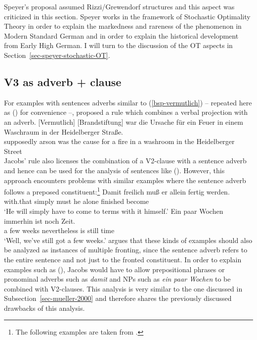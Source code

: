 Speyer's proposal assumed Rizzi/Grewendorf structures and this aspect was criticized in this
section. Speyer works in the framework of Stochastic Optimality Theory in order to explain the
markedness and rareness of the phenomenon in Modern Standard German and in order to explain the
historical development from Early High German. I will turn to the discussion of the OT aspects in Section~\ref{sec-speyer-stochastic-OT}.


\subsection{V3 as adverb + clause}

For examples with sentences adverbs similar to (\ref{bsp-vermutlich}) -- repeated here as ()
for convenience --, \citet[]{Jacobs86a} proposed a rule which combines
a verbal projection with an adverb. 
\ea
\label{bsp-vermutlich-zwei}
\gll {}[Vermutlich] [Brandstiftung] war die Ursache für ein Feuer in einem Waschraum in der Heidelberger Straße.\footnotemark\\
	   \spacebr{}supposedly \spacebr{}arson was the cause for a fire in a washroom in the Heidelberger Street\\
\z
Jacobs' rule also licenses the combination of a V2-clause with a sentence adverb and hence can be
used for the analysis of sentences like (). However, this approach encounters problems with
similar examples where the sentence adverb follows a preposed constituent:\footnote{ 
        The following examples are taken from \citet[]{Engel88}.%
}
\eal
\ex 
\gll Damit freilich muß er allein fertig werden.\\
     with.that simply must he alone finished become\\
\glt `He will simply have to come to terms with it himself.'
\ex 
\gll Ein paar Wochen immerhin ist noch Zeit.\\
     a few weeks nevertheless is still time\\
\glt `Well, we've still got a few weeks.'
\zl
\citet[]{Duerscheid89a} argues that these kinds of examples should also be analyzed as instances of multiple fronting, since the
sentence adverb refers to the entire sentence and not just to the fronted constituent.
In order to explain examples such as (), Jacobs would have to allow prepositional phrases or pronominal adverbs such as \emph{damit}
and NPs such as \emph{ein paar Wochen} to be combined with V2-clauses. This analysis is very similar
to the one discussed in Subsection~\ref{sec-mueller-2000} and therefore shares the previously discussed drawbacks of this analysis.


